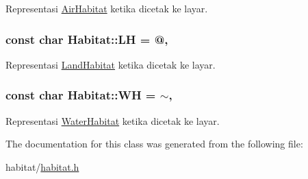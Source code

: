Representasi \hyperlink{classAirHabitat}{Air\+Habitat} ketika dicetak ke layar. 

\subsubsection[{\texorpdfstring{LH}{LH}}]{\setlength{\rightskip}{0pt plus 5cm}const char Habitat\+::\+LH = \textquotesingle{}@\textquotesingle{}\hspace{0.3cm}{\ttfamily [static]}, {\ttfamily [protected]}}\hypertarget{classHabitat_a87fbedb46cde325396e3ef39350e14d7}{}\label{classHabitat_a87fbedb46cde325396e3ef39350e14d7}


Representasi \hyperlink{classLandHabitat}{Land\+Habitat} ketika dicetak ke layar. 

\subsubsection[{\texorpdfstring{WH}{WH}}]{\setlength{\rightskip}{0pt plus 5cm}const char Habitat\+::\+WH = \textquotesingle{}$\sim$\textquotesingle{}\hspace{0.3cm}{\ttfamily [static]}, {\ttfamily [protected]}}\hypertarget{classHabitat_aeba269066b13b0f7b632526af4d547d3}{}\label{classHabitat_aeba269066b13b0f7b632526af4d547d3}


Representasi \hyperlink{classWaterHabitat}{Water\+Habitat} ketika dicetak ke layar. 



The documentation for this class was generated from the following file\+:\begin{DoxyCompactItemize}
\item 
habitat/\hyperlink{habitat_8h}{habitat.\+h}\end{DoxyCompactItemize}
